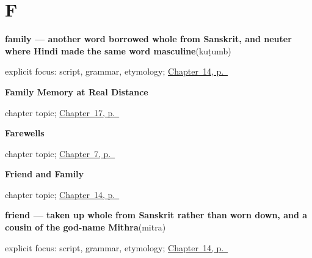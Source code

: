 \section*{F}

\noindent\begin{minipage}[t]{\linewidth}
\raggedright
\textbf{family — another word borrowed whole from Sanskrit, and neuter where Hindi made the same word masculine}\enspace\emph{}\enspace(kuṭumb)\par
\footnotesize explicit focus: script, grammar, etymology; \hyperref[ch:mr-friend-and-family]{Chapter~14, p.~\pageref*{ch:mr-friend-and-family}}
\end{minipage}\par\smallskip

\noindent\begin{minipage}[t]{\linewidth}
\raggedright
\textbf{Family Memory at Real Distance}\par
\footnotesize chapter topic; \hyperref[ch:mr-family-memory]{Chapter~17, p.~\pageref*{ch:mr-family-memory}}
\end{minipage}\par\smallskip

\noindent\begin{minipage}[t]{\linewidth}
\raggedright
\textbf{Farewells}\par
\footnotesize chapter topic; \hyperref[ch:farewells]{Chapter~7, p.~\pageref*{ch:farewells}}
\end{minipage}\par\smallskip

\noindent\begin{minipage}[t]{\linewidth}
\raggedright
\textbf{Friend and Family}\par
\footnotesize chapter topic; \hyperref[ch:mr-friend-and-family]{Chapter~14, p.~\pageref*{ch:mr-friend-and-family}}
\end{minipage}\par\smallskip

\noindent\begin{minipage}[t]{\linewidth}
\raggedright
\textbf{friend — taken up whole from Sanskrit rather than worn down, and a cousin of the god-name Mithra}\enspace\emph{}\enspace(mitra)\par
\footnotesize explicit focus: script, grammar, etymology; \hyperref[ch:mr-friend-and-family]{Chapter~14, p.~\pageref*{ch:mr-friend-and-family}}
\end{minipage}\par\smallskip

